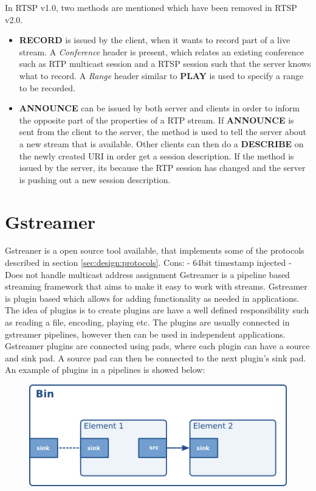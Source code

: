
In RTSP v1.0\citep{RFC2326}, two methods are mentioned which have been removed in RTSP v2.0.
\begin{itemize}
	\item \textbf{RECORD} is issued by the client, when it wants to record part of a live stream. A \textit{Conference} header is present, which relates an existing conference such as RTP multicast session and a RTSP session such that the server knows what to record. A \textit{Range} header similar to \textbf{PLAY} is used to specify a range to be recorded.
	\item \textbf{ANNOUNCE} can be issued by both server and clients in order to inform the opposite part of the properties of a RTP stream. If \textbf{ANNOUNCE} is sent from the client to the server, the method is used to tell the server about a new stream that is available. Other clients can then do a \textbf{DESCRIBE} on the newly created URI in order get a session description. If the method is issued by the server, its because the RTP session has changed and the server is pushing out a new session description.
\end{itemize}


\section{Gstreamer}
Gstreaner is a open source tool available, that implements some of the protocols described in section \ref{sec:design:protocols}.
Cons:
 - 64bit timestamp injected
 - Does not handle multicast address assignment
Gstreamer is a pipeline based streaming framework that aims to make it easy to work with streams. Gstreamer is plugin based which allows for adding functionality as needed in applications. The idea of plugins is to create plugins are have a well defined responsibility such as reading a file, encoding, playing etc. The plugins are usually connected in gstreamer pipelines, however then can be used in independent applications. Gstreamer plugins are connected using pads, where each plugin can have a source and sink pad. A source pad can then be connected to the next plugin's sink pad. An example of plugins in a pipelines is showed below:
\begin{figure}
	\includegraphics[width=1\textwidth]{figures/bin-element-ghost.png}
\end{figure}


